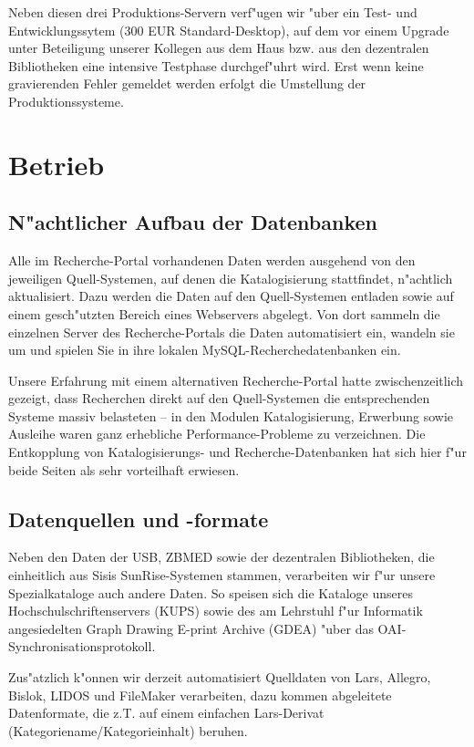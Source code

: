 \documentclass[11pt, twoside, a4paper, BCOR8mm, DIV12, bibtotoc,idxtotoc]{scrbook}
\begin{document}
\begin{itemize}
Neben diesen drei Produktions-Servern verf"ugen wir "uber ein Test-
und Entwicklungssytem (300 EUR Standard-Desktop), auf dem vor einem
Upgrade unter Beteiligung unserer Kollegen aus dem Haus bzw. aus den
dezentralen Bibliotheken eine intensive Testphase durchgef"uhrt wird.
Erst wenn keine gravierenden Fehler gemeldet werden erfolgt die
Umstellung der Produktionssysteme.

\section{Betrieb}
\subsection{N"achtlicher Aufbau der Datenbanken}
Alle im Recherche-Portal vorhandenen Daten werden ausgehend von den
jeweiligen Quell-Sys\-te\-men, auf denen die Katalogisierung stattfindet,
n"achtlich aktualisiert. Dazu werden die Daten auf den Quell-Systemen
entladen sowie auf einem gesch"utzten Bereich eines Webservers
abgelegt. Von dort sammeln die einzelnen Server des Recherche-Portals
die Daten automatisiert ein, wandeln sie um und spielen Sie in ihre
lokalen MySQL-Recherchedatenbanken ein.

Unsere Erfahrung mit einem alternativen Recherche-Portal hatte
zwischenzeitlich gezeigt, dass Recherchen direkt auf den
Quell-Systemen die entsprechenden Systeme massiv belasteten -- in den
Modulen Katalogisierung, Erwerbung sowie Ausleihe waren ganz
erhebliche Performance-Probleme zu verzeichnen. Die Entkopplung von
Katalogisierungs- und Recherche-Datenbanken hat sich hier f"ur beide
Seiten als sehr vorteilhaft erwiesen.


\subsection{Datenquellen und -formate}
Neben den Daten der USB, ZBMED sowie der dezentralen Bibliotheken, die
einheitlich aus Sisis SunRise-Systemen stammen, verarbeiten wir f"ur
unsere Spezialkataloge auch andere Daten. So speisen sich die Kataloge unseres
Hochschulschriftenservers (KUPS) sowie des am Lehrstuhl f"ur Informatik
angesiedelten Graph Drawing E-print Archive (GDEA) "uber das
OAI-Syn\-chro\-ni\-sa\-tions\-pro\-to\-koll.

Zus"atzlich k"onnen wir derzeit automatisiert Quelldaten von Lars,
Allegro, Bislok, LIDOS und FileMaker verarbeiten, dazu kommen
abgeleitete Datenformate, die z.T. auf einem einfachen Lars-Derivat
(Kategoriename/Kategorieinhalt) beruhen.


\end{itemize}
\end{document}
